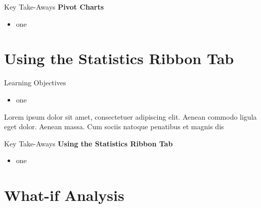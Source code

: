 \begin{center}
	\begin{tkwbox}{Key Take-Aways}
		\textbf{Pivot Charts}
		\\
		\begin{itemize}
			\setlength{\itemsep}{0pt}
			\setlength{\parskip}{0pt}
			\setlength{\parsep}{0pt}
			
			\item one
			
		\end{itemize}
	\end{tkwbox}
\end{center}

\section{Using the Statistics Ribbon Tab}

\begin{center}
	\begin{objbox}{Learning Objectives}
		\begin{itemize}
			\setlength{\itemsep}{0pt}
			\setlength{\parskip}{0pt}
			\setlength{\parsep}{0pt}
			
			\item one
			
		\end{itemize}
	\end{objbox}
\end{center}

Lorem ipsum dolor sit amet, consectetuer adipiscing elit. Aenean commodo ligula eget dolor. Aenean massa. Cum sociis natoque penatibus et magnis dis 

\begin{center}
	\begin{tkwbox}{Key Take-Aways}
		\textbf{Using the Statistics Ribbon Tab}
		\\
		\begin{itemize}
			\setlength{\itemsep}{0pt}
			\setlength{\parskip}{0pt}
			\setlength{\parsep}{0pt}
			
			\item one
			
		\end{itemize}
	\end{tkwbox}
\end{center}

\section{What-if Analysis}

